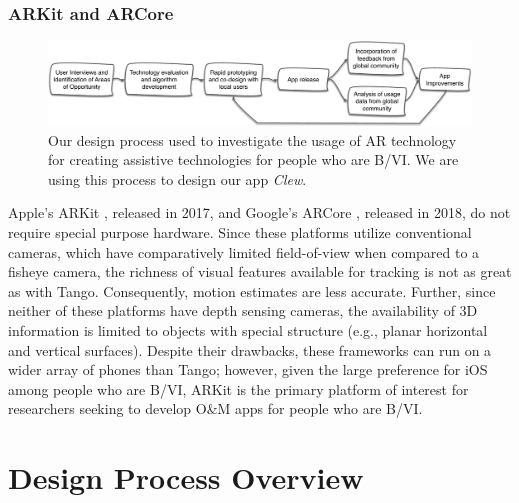 \documentclass[chi_draft]{sigchi}
\newcommand{\BVI}{B/VI\xspace}
\newcommand{\OM}{O\&M\xspace}
\begin{document}
\subsubsection{ARKit and ARCore}
\begin{figure}
\includegraphics[width=\linewidth]{Figures/designprocess}
\caption{Our design process used to investigate the usage of AR technology for creating assistive technologies for people who are \BVI.  We are using this process to design our app \emph{Clew}.\label{fig:designprocess}}
\end{figure}
Apple's ARKit \cite{arkit}, released in 2017, and Google's ARCore \cite{arcore}, released in 2018, do not require special purpose hardware.  Since these platforms utilize conventional cameras, which have comparatively limited field-of-view when compared to a fisheye camera, the richness of visual features available for tracking is not as great as with Tango.  Consequently, motion estimates are less accurate.  Further, since neither of these platforms have depth sensing cameras, the availability of 3D information is limited to objects with special structure (e.g., planar horizontal and vertical surfaces).  Despite their drawbacks, these frameworks can run on a wider array of phones than Tango; however, given the large preference for iOS among people who are \BVI \cite{morris2014blind}, ARKit is the primary platform of interest for researchers seeking to develop \OM apps for people who are \BVI.


\section{Design Process Overview}
\end{document}
